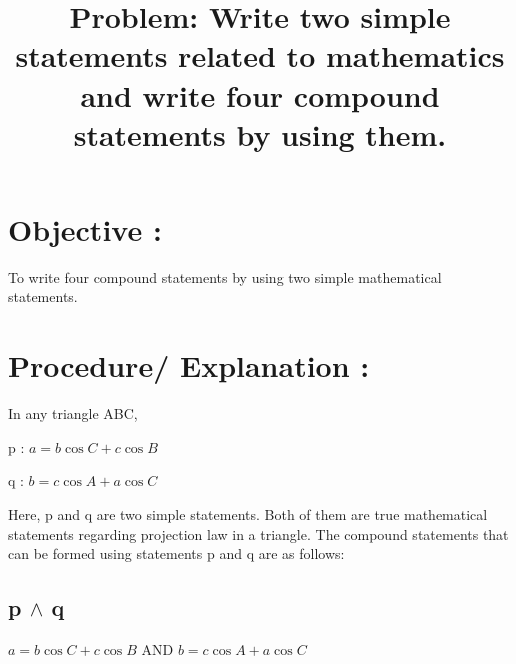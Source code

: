 \documentclass[11pt]{article}
\makeatletter
\def\NormalBaseline{\def\baselinestretch{1.1}}
\def\@shorttitle{\@empty}
\def\shorttitle#1{\gdef\@shorttitle{#1}}
\makeatother
\begin{document}
\renewcommand*\rmdefault{bch}\normalfont\upshape




\shorttitle{}

\date{}  

  
\title{\NormalBaseline\raggedright\bfseries \textbf{Problem:} Write two simple statements related to mathematics and write four compound statements by using them.\\ \vspace{.5cm}















\vspace{-3em}}
  
      	\def\AuAffLabelStyle#1{\textsuperscript{\upshape#1}}
        \def\AuFont{\bfseries\large}
        \def\AuSep{, }
        \def\AffSep{\\}
        \let\origthanks\thanks
\renewcommand\thanks[1]{\begingroup\let\rlap\relax\origthanks{#1}\endgroup}
\author{\hskip2pc\parbox{.95\linewidth}{\AuFont 
    }}
    
    
\maketitle 
\pagestyle{custom}

    
\section{Objective :}
 To write four compound statements by using two simple mathematical statements.
    
\section{Procedure/ Explanation :}
In any triangle ABC,


p : $a=b\cos C + c\cos B$


q : $b=c\cos A + a \cos C$


Here, p and q are two simple statements. Both of them are true mathematical statements regarding projection law in a triangle. The compound statements that can be formed using statements p and q are as follows:
\subsection{p $\wedge{}$ q}
$a=b\cos C+c \cos B$ AND $b=c \cos A+a \cos C$
\end{document}
